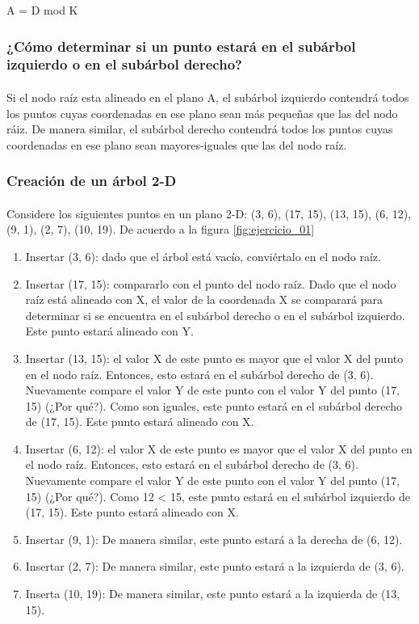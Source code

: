 \documentclass{article}
\begin{document}
A = D mod K

\subsubsection{¿Cómo determinar si un punto estará en el subárbol izquierdo o en el subárbol derecho?}
\paragraph{}
Si el nodo raíz esta alineado en el plano A, el subárbol izquierdo contendrá todos los puntos cuyas coordenadas en ese plano sean más pequeñas que las del nodo ráiz. De manera similar, el subárbol derecho contendrá todos los puntos cuyas coordenadas en ese plano sean mayores-iguales que las del nodo raíz.

\subsubsection{Creación de un árbol 2-D}
\paragraph{}
Considere los siguientes puntos en un plano 2-D:
(3, 6), (17, 15), (13, 15), (6, 12), (9, 1), (2, 7), (10, 19). De acuerdo a la figura \ref{fig:ejercicio_01}

\begin{enumerate}
	\item Insertar (3, 6): dado que el árbol está vacío, conviértalo en el nodo raíz.
	\item Insertar (17, 15): compararlo con el punto del nodo raíz. Dado que el nodo raíz está alineado con X, el valor de la coordenada X se comparará para determinar si se encuentra en el subárbol derecho o en el subárbol izquierdo. Este punto estará alineado con Y.
	\item Insertar (13, 15): el valor X de este punto es mayor que el valor X del punto en el nodo raíz. Entonces, esto estará en el subárbol derecho de (3, 6). Nuevamente compare el valor Y de este punto con el valor Y del punto (17, 15) (¿Por qué?). Como son iguales, este punto estará en el subárbol derecho de (17, 15). Este punto estará alineado con X.
	\item Insertar (6, 12): el valor X de este punto es mayor que el valor X del punto en el nodo raíz. Entonces, esto estará en el subárbol derecho de (3, 6). Nuevamente compare el valor Y de este punto con el valor Y del punto (17, 15) (¿Por qué?). Como 12 < 15, este punto estará en el subárbol izquierdo de (17, 15). Este punto estará alineado con X.
	\item Insertar (9, 1): De manera similar, este punto estará a la derecha de (6, 12).
	\item Insertar (2, 7): De manera similar, este punto estará a la izquierda de (3, 6).
	\item Inserta (10, 19): De manera similar, este punto estará a la izquierda de (13, 15).
\end{enumerate}
\end{document}

